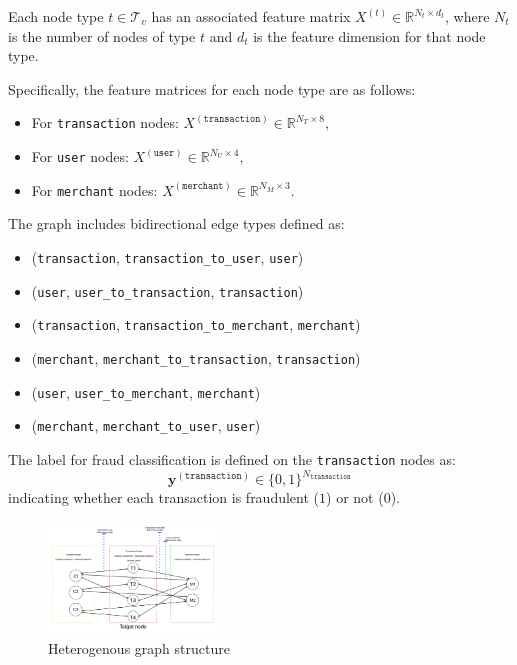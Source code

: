 \documentclass[conference]{IEEEtran}
\begin{document}
Each node type $t \in \mathcal{T}_v$ has an associated feature matrix $X^{(t)} \in \mathbb{R}^{N_t \times d_t}$, where $N_t$ is the number of nodes of type $t$ and $d_t$ is the feature dimension for that node type.

Specifically, the feature matrices for each node type are as follows:
\begin{itemize}
    \item For \texttt{transaction} nodes: $X^{(\texttt{transaction})} \in \mathbb{R}^{N_T \times 8}$,
    \item For \texttt{user} nodes: $X^{(\texttt{user})} \in \mathbb{R}^{N_U \times 4}$,
    \item For \texttt{merchant} nodes: $X^{(\texttt{merchant})} \in \mathbb{R}^{N_M \times 3}$.
\end{itemize}

The graph includes bidirectional edge types defined as:
\begin{itemize}
    \item (\texttt{transaction}, \texttt{transaction\_to\_user}, \texttt{user})
    \item (\texttt{user}, \texttt{user\_to\_transaction}, \texttt{transaction})
    \item (\texttt{transaction}, \texttt{transaction\_to\_merchant}, \texttt{merchant})
    \item (\texttt{merchant}, \texttt{merchant\_to\_transaction}, \texttt{transaction})
    \item (\texttt{user}, \texttt{user\_to\_merchant}, \texttt{merchant})
    \item (\texttt{merchant}, \texttt{merchant\_to\_user}, \texttt{user})
\end{itemize}

The label for fraud classification is defined on the \texttt{transaction} nodes as:
\begin{equation}
    \mathbf{y}^{(\texttt{transaction})} \in \{0, 1\}^{N_{\texttt{transaction}}}
    \label{eq:label}
\end{equation}
indicating whether each transaction is fraudulent ($1$) or not ($0$).

\begin{figure}[htbp]
    \centering
    \includegraphics[width=0.4\textwidth, keepaspectratio]{Graph structure.pdf}
    \caption{Heterogenous graph structure}
    \label{fig:gnn-layer}
\end{figure}
\end{document}
